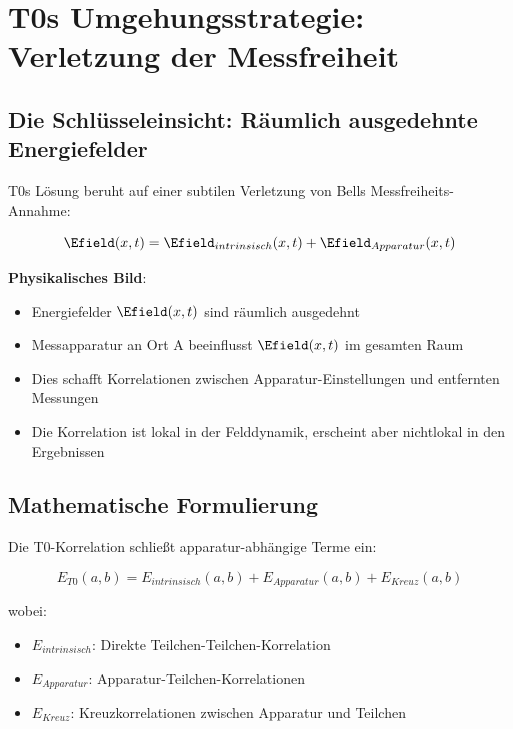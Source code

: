 	\section{T0s Umgehungsstrategie: Verletzung der Messfreiheit}
	
	\subsection{Die Schlüsseleinsicht: Räumlich ausgedehnte Energiefelder}
	
	T0s Lösung beruht auf einer subtilen Verletzung von Bells Messfreiheits-Annahme:
	
	\begin{equation}
		\Efield(x,t) = \Efield_{intrinsisch}(x,t) + \Efield_{Apparatur}(x,t)
	\end{equation}
	
	\textbf{Physikalisches Bild}:
	\begin{itemize}
		\item Energiefelder $\Efield(x,t)$ sind räumlich ausgedehnt
		\item Messapparatur an Ort A beeinflusst $\Efield(x,t)$ im gesamten Raum
		\item Dies schafft Korrelationen zwischen Apparatur-Einstellungen und entfernten Messungen
		\item Die Korrelation ist lokal in der Felddynamik, erscheint aber nichtlokal in den Ergebnissen
	\end{itemize}
	
	\subsection{Mathematische Formulierung}
	
	Die T0-Korrelation schließt apparatur-abhängige Terme ein:
	
	\begin{equation}
		E_{T0}(a,b) = E_{intrinsisch}(a,b) + E_{Apparatur}(a,b) + E_{Kreuz}(a,b)
	\end{equation}
	
	wobei:
	\begin{itemize}
		\item $E_{intrinsisch}$: Direkte Teilchen-Teilchen-Korrelation
		\item $E_{Apparatur}$: Apparatur-Teilchen-Korrelationen
		\item $E_{Kreuz}$: Kreuzkorrelationen zwischen Apparatur und Teilchen
	\end{itemize}
	
